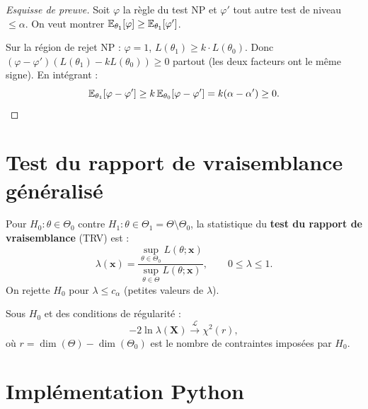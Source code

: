 \begin{proof}[Esquisse de preuve]
Soit $\varphi$ la r\`egle du test NP et $\varphi'$ tout autre test de niveau $\leq\alpha$. On veut montrer $\mathbb{E}_{\theta_1}[\varphi]\geq\mathbb{E}_{\theta_1}[\varphi']$.

Sur la r\'egion de rejet NP : $\varphi=1$, $L(\theta_1)\geq k\cdot L(\theta_0)$. Donc $(\varphi-\varphi')(L(\theta_1)-kL(\theta_0))\geq 0$ partout (les deux facteurs ont le m\^eme signe). En int\'egrant :
\[
\mathbb{E}_{\theta_1}[\varphi-\varphi'] \geq k\,\mathbb{E}_{\theta_0}[\varphi-\varphi'] = k(\alpha-\alpha')\geq 0. \qedhere
\]
\end{proof}

\section{Test du rapport de vraisemblance g\'en\'eralis\'e}

\begin{definition}
Pour $H_0:\theta\in\Theta_0$ contre $H_1:\theta\in\Theta_1=\Theta\setminus\Theta_0$, la statistique du \textbf{test du rapport de vraisemblance} (TRV) est :
\[
\lambda(\mathbf{x}) = \frac{\sup_{\theta\in\Theta_0} L(\theta;\mathbf{x})}{\sup_{\theta\in\Theta} L(\theta;\mathbf{x})}, \qquad 0\leq\lambda\leq 1.
\]
On rejette $H_0$ pour $\lambda\leq c_\alpha$ (petites valeurs de $\lambda$).
\end{definition}

\begin{theoreme}
Sous $H_0$ et des conditions de r\'egularit\'e :
\[
-2\ln\lambda(\mathbf{X}) \xrightarrow{\mathcal{L}} \chi^2(r),
\]
o\`u $r=\dim(\Theta)-\dim(\Theta_0)$ est le nombre de contraintes impos\'ees par $H_0$.
\end{theoreme}

\section{Impl\'ementation Python}


